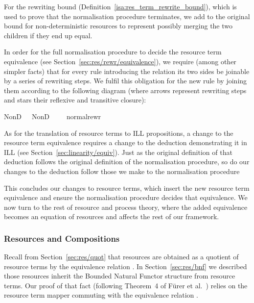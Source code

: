 \documentclass[class=smolathesis,crop=false]{standalone}
\begin{document}
For the rewriting bound (Definition~\ref{isa:res_term_rewrite_bound}), which is used to prove that the normalisation procedure terminates, we add  to the original bound for non-deterministic resources to represent possibly merging the two children if they end up equal.

In order for the full normalisation procedure  to decide the resource term equivalence (see Section~\ref{sec:res/rewr/equivalence}), we require (among other simpler facts) that for every rule introducing the relation its two sides be joinable by a series of rewriting steps.
We fulfil this obligation for the new rule by joining them according to the following diagram (where arrows represent rewriting steps and stars their reflexive and transitive closure):
\begin{isabelle}
\centering
  NonD\ \ \isasymrightarrow\isactrlsup{\isacharasterisk}\ NonD\ \ \ \ \isasymrightarrow\ normal{\isacharunderscore}rewr\ \ \isactrlsup{\isacharasterisk}\isasymleftarrow\ 
\end{isabelle}

As for the translation of resource terms to ILL propositions, a change to the resource term equivalence requires a change to the deduction demonstrating it in ILL (see Section~\ref{sec:linearity/equiv}).
Just as the original definition of that deduction follows the original definition of the normalisation procedure, so do our changes to the deduction follow those we make to the normalisation procedure

This concludes our changes to resource terms, which insert the new resource term equivalence and ensure the normalisation procedure decides that equivalence.
We now turn to the rest of resource and process theory, where the added equivalence becomes an equation of resources and affects the rest of our framework.

\subsubsection{Resources and Compositions}
\label{sec:prob/simple-opt/no-matter/res-proc}

Recall from Section~\ref{sec:res/quot} that resources are obtained as a quotient of resource terms by the equivalence relation \isa{\isasymsim}.
In Section~\ref{sec:res/bnf} we described those resources inherit the Bounded Natural Functor structure from resource terms.
Our proof of that fact (following Theorem~4 of F\"urer et al.~\cite{fuerer_et_al-2020}) relies on the resource term mapper  commuting with the equivalence relation \isa{\isasymsim}.
\end{document}
